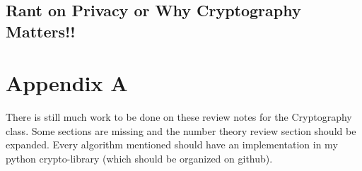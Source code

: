 \documentclass[12pt,a4paper]{article}
\begin{document}
\subsection{Rant on Privacy or Why Cryptography Matters!!}

\section{Appendix A}
There is still much work to be done on these review notes for the Cryptography class. Some sections are missing and the number theory review section should be expanded. Every algorithm mentioned should have an implementation in my python crypto-library (which should be organized on github). 
\end{document}
